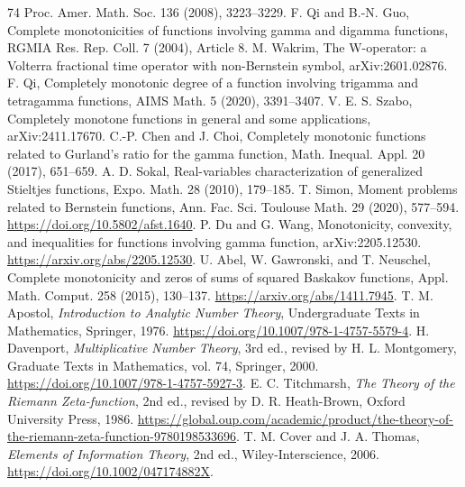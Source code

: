 \begin{thebibliography}{74}
\newblock Proc. Amer. Math. Soc. 136 (2008), 3223--3229.
F. Qi and B.-N. Guo,
\newblock Complete monotonicities of functions involving gamma and digamma
  functions,
\newblock RGMIA Res. Rep. Coll. 7 (2004), Article 8.
M. Wakrim,
\newblock The W-operator: a Volterra fractional time operator with
  non-Bernstein symbol,
\newblock arXiv:2601.02876.
F. Qi,
\newblock Completely monotonic degree of a function involving trigamma and
  tetragamma functions,
\newblock AIMS Math. 5 (2020), 3391--3407.
V. E. S. Szabo,
\newblock Completely monotone functions in general and some applications,
\newblock arXiv:2411.17670.
C.-P. Chen and J. Choi,
\newblock Completely monotonic functions related to Gurland's ratio for the
  gamma function,
\newblock Math. Inequal. Appl. 20 (2017), 651--659.
A. D. Sokal,
\newblock Real-variables characterization of generalized Stieltjes functions,
\newblock Expo. Math. 28 (2010), 179--185.
T. Simon,
\newblock Moment problems related to Bernstein functions,
\newblock Ann. Fac. Sci. Toulouse Math. 29 (2020), 577--594.
\url{https://doi.org/10.5802/afst.1640}.
P. Du and G. Wang,
\newblock Monotonicity, convexity, and inequalities for functions involving
  gamma function,
\newblock arXiv:2205.12530.
\url{https://arxiv.org/abs/2205.12530}.
U. Abel, W. Gawronski, and T. Neuschel,
\newblock Complete monotonicity and zeros of sums of squared Baskakov
  functions,
\newblock Appl. Math. Comput. 258 (2015), 130--137.
\url{https://arxiv.org/abs/1411.7945}.
T. M. Apostol,
\emph{Introduction to Analytic Number Theory},
Undergraduate Texts in Mathematics, Springer, 1976.
\url{https://doi.org/10.1007/978-1-4757-5579-4}.
H. Davenport,
\emph{Multiplicative Number Theory},
3rd ed., revised by H. L. Montgomery, Graduate Texts in Mathematics, vol. 74, Springer, 2000.
\url{https://doi.org/10.1007/978-1-4757-5927-3}.
E. C. Titchmarsh,
\emph{The Theory of the Riemann Zeta-function},
2nd ed., revised by D. R. Heath-Brown, Oxford University Press, 1986.
\url{https://global.oup.com/academic/product/the-theory-of-the-riemann-zeta-function-9780198533696}.
T. M. Cover and J. A. Thomas,
\emph{Elements of Information Theory},
2nd ed., Wiley-Interscience, 2006.
\url{https://doi.org/10.1002/047174882X}.
\end{thebibliography}
